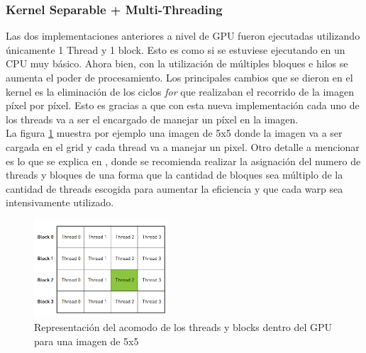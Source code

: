 \documentclass[conference]{IEEEtran}
\begin{document}
\subsubsection{\textbf{Kernel Separable + Multi-Threading}}
Las dos implementaciones anteriores a nivel de GPU fueron ejecutadas utilizando únicamente 1 Thread y 1 block. Esto es como si se estuviese ejecutando en un CPU muy básico. Ahora bien, con la utilización de múltiples bloques e hilos se aumenta el poder de procesamiento.
Los principales cambios que se dieron en el kernel es la eliminación de los ciclos \textit{for} que realizaban el recorrido de la imagen píxel por píxel. Esto es gracias a que con esta nueva implementación cada uno de los threads va a ser el encargado de manejar un píxel en la imagen.\\
La figura \ref{threads_blocks} muestra por ejemplo una imagen de 5x5 donde la imagen va a ser cargada en el grid y cada thread va a manejar un pixel. Otro detalle a mencionar es lo que se explica en \cite{cuda_by_example}, donde se recomienda realizar la asignación del numero de threads y bloques de una forma que la cantidad de bloques sea múltiplo de la cantidad de threads escogida para aumentar la eficiencia y que cada warp sea intensivamente utilizado.
\begin{figure}[H]
\centering
\includegraphics[width=5cm]{threads_blocks}
\caption{Representación del acomodo de los threads y blocks dentro del GPU para una imagen de 5x5 \cite{cuda_by_example}}
\label{threads_blocks}
\end{figure}
\end{document}
